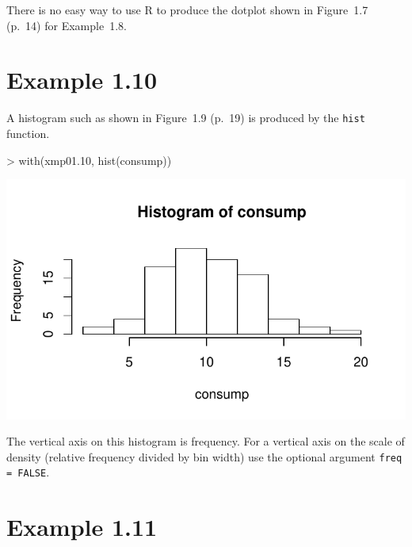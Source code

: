 \documentclass{book}
\begin{document}
There is no easy way to use R to produce the dotplot shown in
Figure~1.7 (p.~14) for Example~1.8.


\section{Example 1.10}
\label{sec:xmp01.10}

A histogram such as shown in Figure~1.9 (p.~19) is produced by the
\texttt{hist} function.
\begin{center}
\begin{Schunk}
\begin{Sinput}
> with(xmp01.10, hist(consump))
\end{Sinput}
\end{Schunk}
\includegraphics{Devore6-xmp0110}
\end{center}
The vertical axis on this histogram is frequency.  For a vertical axis
on the scale of density (relative frequency divided by bin width) use
the optional argument \texttt{freq = FALSE}.


\section{Example 1.11}
\label{sec:xmp01.11}
\end{document}
